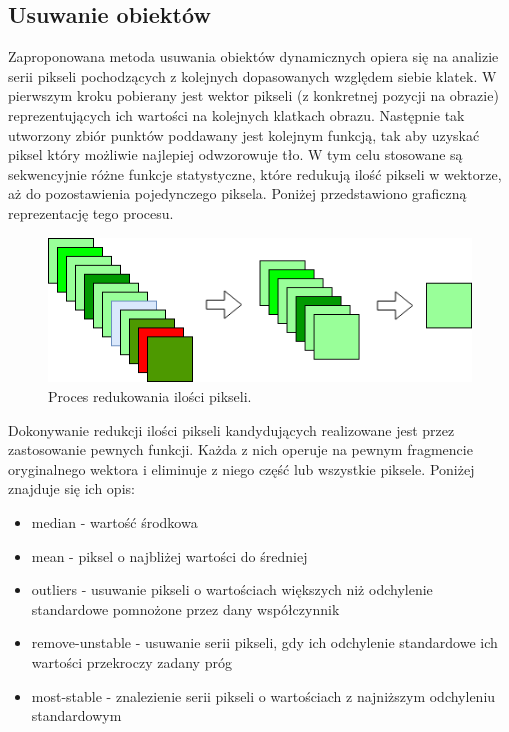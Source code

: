 \subsection{Usuwanie obiektów}

Zaproponowana metoda usuwania obiektów dynamicznych opiera się na analizie serii pikseli pochodzących z kolejnych dopasowanych względem siebie klatek. W pierwszym kroku pobierany jest wektor pikseli (z konkretnej pozycji na obrazie) reprezentujących ich wartości na kolejnych klatkach obrazu. Następnie tak utworzony zbiór punktów poddawany jest kolejnym funkcją, tak aby uzyskać piksel który możliwie najlepiej odwzorowuje tło. W tym celu stosowane są sekwencyjnie różne funkcje statystyczne, które redukują ilość pikseli w wektorze, aż do pozostawienia pojedynczego piksela. Poniżej przedstawiono graficzną reprezentację tego procesu.

\begin{figure}[H]
	\centering
		\includegraphics[width=0.75\linewidth]{img/process.png}
	\caption[Redukcja ilości pikseli.]{Proces redukowania ilości pikseli.}
	\label{fig:binary}
\end{figure}

Dokonywanie redukcji ilości pikseli kandydujących realizowane jest przez zastosowanie pewnych funkcji. Każda z nich operuje na pewnym fragmencie oryginalnego wektora i eliminuje z niego część lub wszystkie piksele. Poniżej znajduje się ich opis:
\begin{itemize}
\item median - wartość środkowa 
\item mean - piksel o najbliżej wartości do średniej
\item outliers - usuwanie pikseli o wartościach większych niż odchylenie standardowe pomnożone przez dany współczynnik
\item remove-unstable - usuwanie serii pikseli, gdy ich odchylenie standardowe ich wartości przekroczy zadany próg
\item most-stable - znalezienie serii pikseli o wartościach z najniższym odchyleniu standardowym
\end{itemize}

